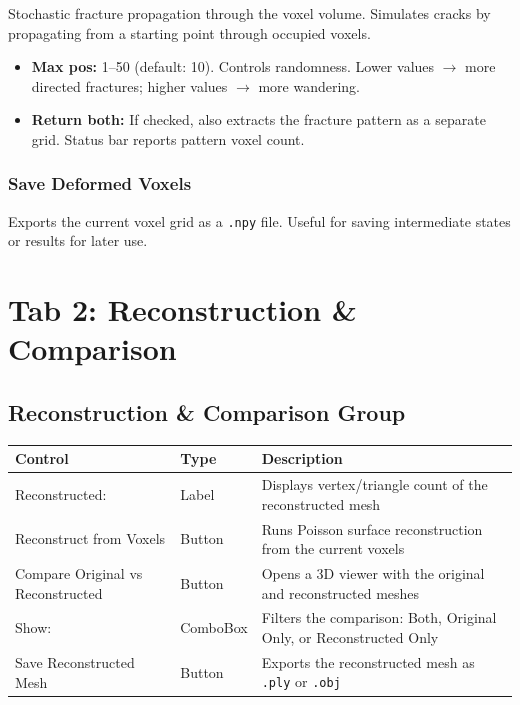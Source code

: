\documentclass[12pt,a4paper]{article}
\begin{document}
Stochastic fracture propagation through the voxel volume. Simulates cracks by propagating from a starting point through occupied voxels.

\begin{itemize}
  \item \textbf{Max pos:} 1--50 (default: 10). Controls randomness. Lower values $\rightarrow$ more directed fractures; higher values $\rightarrow$ more wandering.
  \item \textbf{Return both:} If checked, also extracts the fracture pattern as a separate grid. Status bar reports pattern voxel count.
\end{itemize}

\subsubsection{Save Deformed Voxels}

Exports the current voxel grid as a \texttt{.npy} file. Useful for saving intermediate states or results for later use.

\section{Tab 2: Reconstruction \& Comparison}

\subsection{Reconstruction \& Comparison Group}

\begin{table}[H]
\centering
\begin{tabular}{llp{8cm}}
\toprule
\textbf{Control} & \textbf{Type} & \textbf{Description} \\
\midrule
Reconstructed: & Label & Displays vertex/triangle count of the reconstructed mesh \\
Reconstruct from Voxels & Button & Runs Poisson surface reconstruction from the current voxels \\
Compare Original vs Reconstructed & Button & Opens a 3D viewer with the original and reconstructed meshes \\
Show: & ComboBox & Filters the comparison: Both, Original Only, or Reconstructed Only \\
Save Reconstructed Mesh & Button & Exports the reconstructed mesh as \texttt{.ply} or \texttt{.obj} \\
\bottomrule
\end{tabular}
\end{table}
\end{document}
